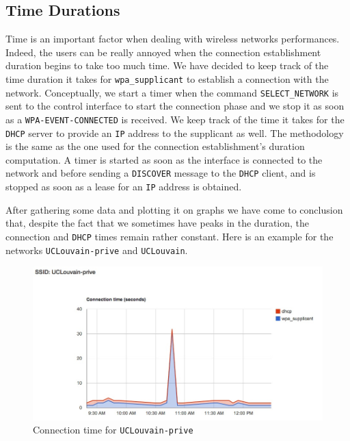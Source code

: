 \subsection{Time Durations}
Time is an important factor when dealing with wireless networks performances. Indeed, the users can be really annoyed when the connection establishment duration begins to take too much time. We have decided to keep track of the time duration it takes for \texttt{wpa\_supplicant} to establish a connection with the network. Conceptually, we start a timer when the command \texttt{SELECT\_NETWORK} is sent to the control interface to start the connection phase and we stop it as soon as a \texttt{WPA-EVENT-CONNECTED} is received. We keep track of the time it takes for the \texttt{DHCP} server to provide an \texttt{IP} address to the supplicant as well. The methodology is the same as the one used for the connection establishment's duration computation. A timer is started as soon as the interface is connected to the network and before sending a \texttt{DISCOVER} message to the \texttt{DHCP} client, and is stopped as soon as a lease for an \texttt{IP} address is obtained.

After gathering some data and plotting it on graphs we have come to conclusion that, despite the fact that we sometimes have peaks in the duration, the connection and \texttt{DHCP} times remain rather constant. Here is an example for the networks \texttt{UCLouvain-prive} and \texttt{UCLouvain}.

\begin{figure}[H]
	\centering
   \includegraphics[width=1\textwidth]{Pictures/chapter6/time-uclouvain-prive.jpg}
   \caption{Connection time for \texttt{UCLouvain-prive}}
\end{figure} 

